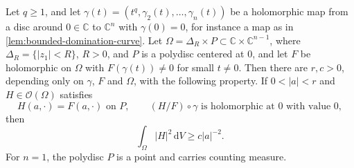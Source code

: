 \begin{lemma}\label{lem:curve-extension-norm-lower-bound}
Let $q\geq1$, and let $\gamma(t)=(t^q,\gamma_2(t),\ldots,\gamma_n(t))$ be a holomorphic map from a disc around $0\in\mathbb C$ to $\mathbb C^n$ with $\gamma(0)=0$, for instance a map as in \cref{lem:bounded-domination-curve}. Let $\Omega=\Delta_R\times P\subset\mathbb C\times\mathbb C^{n-1}$, where $\Delta_R=\{|z_1|<R\}$, $R>0$, and $P$ is a polydisc centered at $0$, and let $F$ be holomorphic on $\Omega$ with $F(\gamma(t))\neq0$ for small $t\neq0$. Then there are $r,c>0$, depending only on $\gamma$, $F$ and $\Omega$, with the following property. If $0<|a|<r$ and $H\in\mathcal O(\Omega)$ satisfies
\[
 H(a,\cdot)=F(a,\cdot)\text{ on }P,\qquad
 (H/F)\circ\gamma\text{ is holomorphic at }0\text{ with value }0,
\]
then
\begin{equation}\label{eq:curve-extension-norm-lower-bound}
 \int_\Omega|H|^2\,\mathrm dV\geq c|a|^{-2}.
\end{equation}
For $n=1$, the polydisc $P$ is a point and carries counting measure.
\end{lemma}

